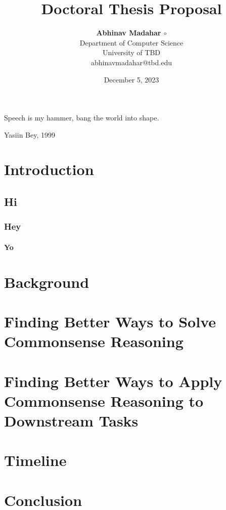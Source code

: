 \documentclass[12pt]{report}
\title{\textbf{Doctoral Thesis Proposal}}
\author{\textbf{Abhinav Madahar $\circ$ {\normalfont {\devanagari अभिनव मदहर}}}  \\
Department of Computer Science \\
University of TBD \\
{\small abhinavmadahar@tbd.edu}}
\date{December 5, 2023}
\newcommand{\pageoftext}{\lipsum[1-8]}
\begin{document}
\pagestyle{plain}
\maketitle

\pagebreak
\vspace*{\fill}
\noindent Speech is my hammer, bang the world into shape.

\noindent Yasiin Bey, 1999
\vspace*{\fill}
 
\pagebreak
\begin{abstract}
    \lipsum[1]
\end{abstract}

\pagebreak
{}
\tableofcontents
\restoregeometry
\pagebreak

\cleardoublepage
{}

\newpage
\chapter{Introduction}
\section{Hi}
\subsection{Hey}
\subsubsection{Yo}
\pageoftext
\pageoftext
\pageoftext

\newpage
\chapter{Background}
\pageoftext
\pageoftext

\newpage
\chapter{Finding Better Ways to Solve Commonsense Reasoning}
\pageoftext
\pageoftext
\pageoftext
\pageoftext

\newpage
\chapter{Finding Better Ways to Apply Commonsense Reasoning to Downstream Tasks}
\pageoftext
\pageoftext
\pageoftext
\pageoftext
\pageoftext

\newpage
\chapter{Timeline}
\pageoftext

\chapter{Conclusion}
\lipsum

\begin{footnotesize}
    
    
\end{footnotesize}
\end{document}
